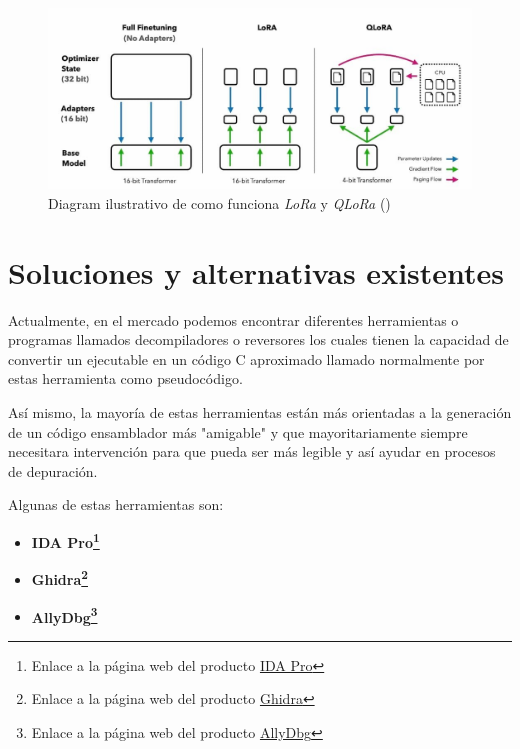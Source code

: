 \begin{figure}[H]
    \begin{center}
      \includegraphics[width=12cm]{figuras/Capitulo_03/QLoRa.jpg}
    \end{center}
    \caption[Diagram ilustrativo de como funciona \textit{LoRa} y \textit{QLoRa}]{Diagram ilustrativo de como funciona \textit{LoRa} y \textit{QLoRa} (\cite{DettmersTim2023QEFo})}
    \label{fig:qlora}
\end{figure}

\section{Soluciones y alternativas existentes}
\label{sec:alternativas}


Actualmente, en el mercado podemos encontrar diferentes herramientas o programas llamados
decompiladores o reversores los cuales tienen la capacidad de convertir un ejecutable
en un código C aproximado llamado normalmente por estas herramienta como pseudocódigo.

Así mismo, la mayoría de estas herramientas están más orientadas a la generación de un
código ensamblador más "amigable" y que mayoritariamente siempre necesitara intervención
para que pueda ser más legible y así ayudar en procesos de depuración.

Algunas de estas herramientas son:

\begin{itemize}
    \item \bf IDA Pro\footnote{Enlace a la página web del producto \href{https://hex-rays.com/ida-pro/}{IDA Pro}}
    \item \bf Ghidra\footnote{Enlace a la página web del producto \href{https://ghidra-sre.org/}{Ghidra}}
    \item \bf AllyDbg\footnote{Enlace a la página web del producto \href{https://www.ollydbg.de/}{AllyDbg}}
\end{itemize}

